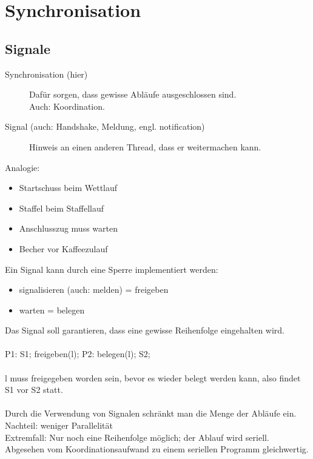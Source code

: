 \chapter{Synchronisation}

\section{Signale}
\begin{description}
\item[Synchronisation (hier)] Dafür sorgen, dass gewisse Abläufe ausgeschlossen sind.\\
Auch: Koordination.
\item[Signal (auch: Handshake, Meldung, engl. notification)] Hinweis an einen anderen Thread, dass er weitermachen kann.
\end{description}

Analogie:
\begin{itemize}
	\item Startschuss beim Wettlauf
	\item Staffel beim Staffellauf
	\item Anschlusszug muss warten
	\item Becher vor Kaffeezulauf
\end{itemize}

Ein Signal kann durch eine Sperre implementiert werden: 
\begin{itemize}
	\item signalisieren (auch: melden) = freigeben
	\item warten = belegen
\end{itemize}
Das Signal soll garantieren, dass eine gewisse Reihenfolge eingehalten wird.\\
\\ %
P1: S1;
	freigeben(l);
P2:	belegen(l);
	S2;\\
\\
l muss freigegeben worden sein, bevor es wieder belegt werden kann, also findet S1 vor S2 statt.\\
\\
Durch die Verwendung von Signalen schränkt man die Menge der Abläufe ein.\\
Nachteil: weniger Parallelität\\
Extremfall: Nur noch eine Reihenfolge möglich; der Ablauf wird seriell. Abgesehen vom Koordinationsaufwand zu einem seriellen Programm gleichwertig.

